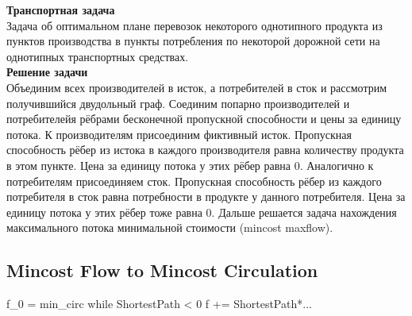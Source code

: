 {\bfseries Транспортная задача} \\
Задача об оптимальном плане перевозок некоторого однотипного продукта из пунктов производства в пункты потребления по некоторой дорожной сети на однотипных транспортных средствах.\\
{\bfseries Решение задачи}\\
Объединим всех производителей в исток, а потребителей в сток и рассмотрим получившийся двудольный граф. Соединим попарно производителей и потребителейя рёбрами бесконечной пропускной способности 
и цены за единицу потока. К производителям присоединим фиктивный исток. Пропускная способность рёбер из истока в каждого производителя равна количеству продукта в этом пункте. Цена за единицу потока 
у этих рёбер равна 0. Аналогично к потребителям присоединяем сток. Пропускная способность рёбер из каждого потребителя в сток равна потребности в продукте у данного потребителя. Цена за единицу потока 
у этих рёбер тоже равна 0. Дальше решается задача нахождения максимального потока минимальной стоимости (mincost maxflow).

\subsection{Mincost Flow to Mincost Circulation}
\begin{cppcode}
	f_0 = min_circ
	while ShortestPath < 0
		f += ShortestPath*...
\end{cppcode}

